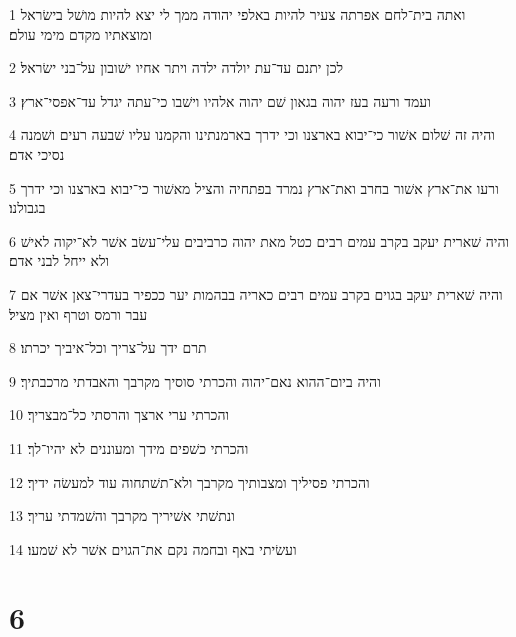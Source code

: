 \par 1 ואתה בית־לחם אפרתה צעיר להיות באלפי יהודה ממך לי יצא להיות מושׁל בישׂראל ומוצאתיו מקדם מימי עולם׃
\par 2 לכן יתנם עד־עת יולדה ילדה ויתר אחיו ישׁובון על־בני ישׂראל׃
\par 3 ועמד ורעה בעז יהוה בגאון שׁם יהוה אלהיו וישׁבו כי־עתה יגדל עד־אפסי־ארץ׃
\par 4 והיה זה שׁלום אשׁור כי־יבוא בארצנו וכי ידרך בארמנתינו והקמנו עליו שׁבעה רעים ושׁמנה נסיכי אדם׃
\par 5 ורעו את־ארץ אשׁור בחרב ואת־ארץ נמרד בפתחיה והציל מאשׁור כי־יבוא בארצנו וכי ידרך בגבולנו׃
\par 6 והיה שׁארית יעקב בקרב עמים רבים כטל מאת יהוה כרביבים עלי־עשׂב אשׁר לא־יקוה לאישׁ ולא ייחל לבני אדם׃
\par 7 והיה שׁארית יעקב בגוים בקרב עמים רבים כאריה בבהמות יער ככפיר בעדרי־צאן אשׁר אם עבר ורמס וטרף ואין מציל׃
\par 8 תרם ידך על־צריך וכל־איביך יכרתו׃
\par 9 והיה ביום־ההוא נאם־יהוה והכרתי סוסיך מקרבך והאבדתי מרכבתיך׃
\par 10 והכרתי ערי ארצך והרסתי כל־מבצריך׃
\par 11 והכרתי כשׁפים מידך ומעוננים לא יהיו־לך׃
\par 12 והכרתי פסיליך ומצבותיך מקרבך ולא־תשׁתחוה עוד למעשׂה ידיך׃
\par 13 ונתשׁתי אשׁיריך מקרבך והשׁמדתי עריך׃
\par 14 ועשׂיתי באף ובחמה נקם את־הגוים אשׁר לא שׁמעו׃

\chapter{6}

